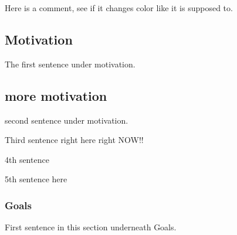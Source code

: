 \documentclass[modern]{CORE-AAS/aastex631}
\begin{document}
{%

Here is a comment, see if it changes color like it is supposed to. 
\subsection{Motivation} %
\label{sub:motivation}

The first sentence under motivation. \citep{bernardi+2006aj131_1288}
\subsection{more motivation}
\label{sub:more_motivation}

second sentence under motivation.

Third sentence right here right NOW!! 


4th sentence

5th sentence here 

\subsubsection{Goals}
\label{subsub:goals}
First sentence in this section underneath Goals. 


}
\end{document}
